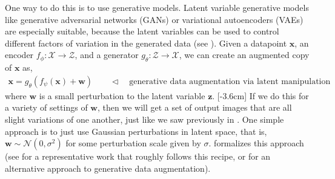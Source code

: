 One way to do this is to use generative models. Latent variable generative models like generative adversarial networks (GANs) or variational autoencoders (VAEs) are especially suitable, because the latent variables can be used to control different factors of variation in the generated data (see \chap{\ref{chapter:generative_modeling_and_representation_learning}}). Given a datapoint $\mathbf{x}$, an encoder $f_{\phi}: \mathcal{X} \rightarrow \mathcal{Z}$, and a generator $g_{\theta}: \mathcal{Z} \rightarrow \mathcal{X}$, we can create an augmented copy of $\mathbf{x}$ as, 
\begin{align}
    \mathbf{x} = g_{\theta}(f_{\psi}(\mathbf{x})+\mathbf{w}) \quad\quad \triangleleft \quad\text{generative data augmentation via latent manipulation}
\end{align}
where $\mathbf{w}$ is a small perturbation to the latent variable $\mathbf{z}$. 
[-3.6cm]
If we do this for a variety of settings of $\mathbf{w}$, then we will get a set of output images that are all slight variations of one another, just like we saw previously in \fig{\ref{fig:generative_modeling_and_representation_learning:biggan_latent_walk}}. One simple approach is to just use Gaussian perturbations in latent space, that is, $\mathbf{w} \sim \mathcal{N}(0,\sigma^2)$ for some perturbation scale given by $\sigma$. 
\Algref{\ref{alg:data_augmentation:generative_data_augmentation}} formalizes this approach (see \cite{chai2021ensembling} for a representative work that roughly follows this recipe, or \cite{azizi2023synthetic} for an alternative approach to generative data augmentation).
